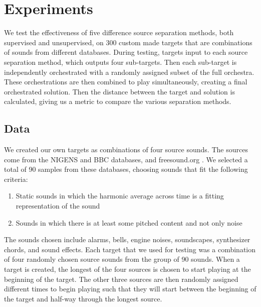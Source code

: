 \documentclass{article}
\begin{document}
	
	\section{Experiments}\label{sec:experiments}
	
	We test the effectiveness of five difference source separation methods, both supervised and unsupervised, on 300 custom made targets that are combinations of sounds from different databases. During testing, targets input to each source separation method, which outputs four sub-targets. Then each sub-target is independently orchestrated with a randomly assigned subset of the full orchestra. These orchestrations are then combined to play simultaneously, creating a final orchestrated solution. Then the distance between the target and solution is calculated, giving us a metric to compare the various separation methods.
	
		\subsection{Data}\label{subsec:data}
		We created our own targets as combinations of four source sounds. The sources come from the NIGENS \cite{NIGENS} and BBC \cite{BBC} databases, and freesound.org \cite{freesound}. We selected a total of 90 samples from these databases, choosing sounds that fit the following criteria: 
		
		\begin{enumerate}
			\item Static sounds in which the harmonic average across time is a fitting representation of the sound
			\item Sounds in which there is at least some pitched content and not only noise
		\end{enumerate}			
		The sounds chosen include alarms, bells, engine noises, soundscapes, synthesizer chords, and sound effects. Each target that we used for testing was a combination of four randomly chosen source sounds from the group of 90 sounds. 
		When a target is created, the longest of the four sources is chosen to start playing at the beginning of the target. The other three sources are then randomly assigned different times to begin playing such that they will start between the beginning of the target and half-way through the longest source.
		
\end{document}
